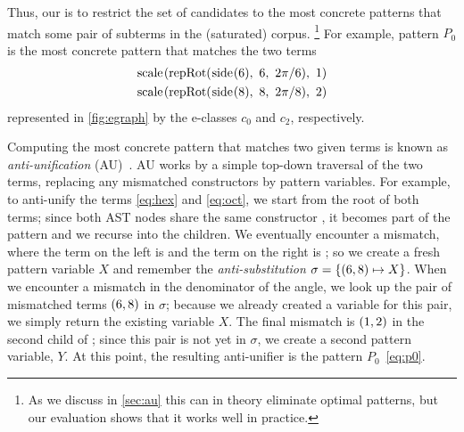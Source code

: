 Thus,
  our  is 
  to restrict the set of candidates
  to the most concrete patterns that match some pair
  of subterms in the (saturated) corpus.%
  \footnote{As we discuss in \autoref{sec:au} this can in theory eliminate optimal patterns,
  but our evaluation shows that it works well in practice.}
%
For example, pattern $P_0$
  is the most concrete pattern that matches the two terms
  \begin{gather}
    \scale{\repRot{\pSide{6}}{6}{2\pi/6}}{1}\label{eq:hex}\\
    \scale{\repRot{\pSide{8}}{8}{2\pi/8}}{2}\label{eq:oct}
  \end{gather}
  represented in \autoref{fig:egraph} by the e-classes $c_0$ and $c_2$, respectively.
%

%
Computing the most concrete pattern that
  matches two given terms is known as
  \emph{anti-unification} (AU)~\cite{Reynolds1969TransformationalSA,plotkin1970lattice}.
AU works by
  a simple top-down traversal of the two terms,
  replacing any mismatched constructors by pattern variables.
For example,
  to anti-unify the terms \eqref{eq:hex} and \eqref{eq:oct},
  we start from the root of both terms;
  since both AST nodes share the same constructor , %
  it becomes part of the pattern and we recurse into the children.
We eventually encounter a mismatch, where
  the term on the left is  and
  the term on the right is ;
  so we create a fresh pattern variable $X$ and
  remember the \emph{anti-substitution}
  $\sigma = \{(\T{6}, \T{8}) \mapsto X\}$.
When we encounter a mismatch
  in the denominator of the angle,
  we look up the pair of mismatched terms
  $(\T{6}, \T{8})$ in $\sigma$;
  because we already created a variable for this pair,
  we simply return the existing variable $X$.
The final mismatch is $(\T{1}, \T{2})$
  in the second child of ; %
  since this pair is not yet in $\sigma$,
  we create a second pattern variable, $Y$.
At this point,
  the resulting anti-unifier is the pattern $P_0$~\eqref{eq:p0}.

